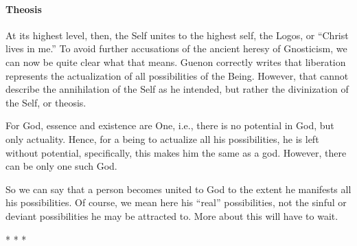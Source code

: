 \paragraph{Theosis}
At its highest level, then, the Self unites to the highest self, the Logos, or “Christ lives in me.” To avoid further accusations of the ancient heresy of Gnosticism, we can now be quite clear what that means. Guenon correctly writes that liberation represents the actualization of all possibilities of the Being. However, that cannot describe the annihilation of the Self as he intended, but rather the divinization of the Self, or theosis.

For God, essence and existence are One, i.e., there is no potential in God, but only actuality. Hence, for a being to actualize all his possibilities, he is left without potential, specifically, this makes him the same as a god. However, there can be only one such God.

So we can say that a person becomes united to God to the extent he manifests all his possibilities. Of course, we mean here his “real” possibilities, not the sinful or deviant possibilities he may be attracted to. More about this will have to wait.




\begin{center}* * *\end{center}

